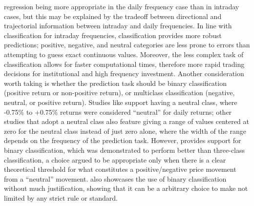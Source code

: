 \documentclass[stu,floatsintext]{apa7}
\begin{document}
regression being more appropriate in the daily frequency case than in intraday cases, but this may be explained by the tradeoff between directional and trajectorial information between intraday and daily frequencies. In line with classification for intraday frequencies, classification provides more robust predictions; positive, negative, and neutral categories are less prone to errors than attempting to guess exact continuous values. Moreover, the less complex task of classification allows for faster computational times, therefore more rapid trading decisions for institutional and high frequency investment. Another consideration worth taking is whether the prediction task should be binary classification (positive return or non-positive return), or multiclass classification (negative, neutral, or positive return). Studies like \textcite{he2021multimodal} support having a neutral class, where -0.75\% to +0.75\% returns were considered ``neutral'' for daily returns; other studies \parencite{kim2019hats} that adopt a neutral class also feature giving a range of values centered at zero for the neutral class instead of just zero alone, where the width of the range depends on the frequency of the prediction task. However, \textcite{chen2021stock} provides support for binary classification, which was demonstrated to perform better than three-class classification, a choice argued to be appropriate only when there is a clear theoretical threshold for what constitutes a positive/negative price movement from a ``neutral'' movement. \textcite{chen2026newsdriven} also showcases the use of binary classification without much justification, showing that it can be a arbitrary choice to make not limited by any strict rule or standard.
\end{document}
